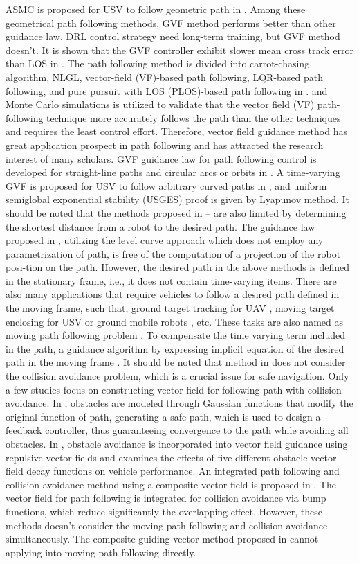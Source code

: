 \documentclass[a4paper, 10pt, conference]{ieeeconf}      %
\begin{document}
ASMC is proposed for USV to follow geometric path in \cite{c9}. Among these geometrical path following methods, GVF method performs better than other guidance law. DRL control strategy need long-term training, but GVF method doesn't. It is shown that the GVF controller exhibit slower mean cross track error than LOS in \cite{c10}. The path following method is divided into carrot-chasing algorithm, NLGL, vector-field (VF)-based path following, LQR-based path following, and pure pursuit with LOS (PLOS)-based path following in \cite{c11}. and Monte Carlo simulations is utilized to validate that the vector field (VF) path-following technique more accurately follows the path than the other techniques and requires the least control effort. Therefore, vector field guidance method has great application prospect in path following and has attracted the research interest of many scholars. GVF guidance law for path following control is developed for straight-line paths and circular arcs or orbits in \cite{c12}. A time-varying GVF is proposed for USV to follow arbitrary curved paths in \cite{c13}, and uniform semiglobal exponential stability (USGES) proof is given by Lyapunov method.  It should be noted that the methods proposed in \cite{c12}--\cite{c14} are also limited by determining the shortest distance from a robot to the desired path. The guidance law proposed in \cite{c14,c15}, utilizing the level curve approach which does not employ any parametrization of path, is free of the computation of a projection of the robot posi-tion on the path. However, the desired path in the above methods is defined in the stationary frame, i.e., it does not contain time-varying items. There are also many applications that require vehicles to follow a desired path defined in the moving frame, such that, ground target tracking for UAV \cite{c16}, moving target enclosing for USV \cite{c17} or ground mobile robots \cite{c18}, etc. These tasks are also named as moving path following problem \cite{c21}. To compensate the time varying term included in the path, a guidance algorithm by expressing implicit equation of the desired path in the moving frame \cite{c19}. It should be noted that method in \cite{c19}  does not consider the collision avoidance problem, which is a crucial issue for safe navigation. Only a few studies focus on constructing vector field for following path with collision avoidance. In \cite{c20}, obstacles are modeled through Gaussian functions that modify the original function of path, generating a safe path, which is used to design a feedback controller, thus guaranteeing convergence to the path while avoiding all obstacles. In \cite{c21}, obstacle avoidance is incorporated into vector field guidance using repulsive vector fields and examines the effects of five different obstacle vector field decay functions on vehicle performance. An integrated path following and collision avoidance method using a composite vector field is proposed in \cite{c22}. The vector field for path following is integrated for collision avoidance via bump functions, which reduce significantly the overlapping effect. However, these methods doesn't consider the moving path following and collision avoidance simultaneously. The composite guiding vector method proposed in \cite{c22} cannot applying into moving path following directly.
\end{document}
